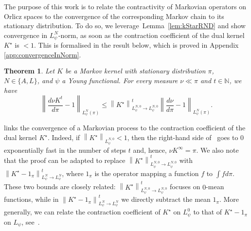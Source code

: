 \documentclass[11pt]{article}
\theoremstyle{plain}
\newtheorem{theorem}{Theorem}[section]
\theoremstyle{remark}
\begin{document}
    The purpose of this work is to relate the contractivity of Markovian operators %
    on Orlicz spaces to the convergence of the corresponding Markov chain to its stationary distribution. %
    To do so, we leverage~Lemma~\ref{lem:kStarRND} and show %
    convergence in $L_\psi^N$-norm, as soon as the contraction coefficient of the dual kernel ${K}^\star$ is $<1$. This is formalised in the result below, which is proved in Appendix \ref{app:convergenceInNorm}. %
    \begin{theorem}\label{thm:convergenceInNorm}
        Let $K$ be a Markov kernel with stationary distribution $\pi$, $N\in\{A,L\}$, and $\psi$ a Young functional. %
        For every measure $\nu\ll\pi$ and $t\in\mathbb{N}$, we have %
    \begin{equation}
            \left\lVert \frac{d\nu K^t}{d\pi} - 1 \right\rVert_{L^N_\psi(\pi)} \leq \left\lVert {K}^\star\right\rVert_{L_\psi^{N,0}\to L_\psi^{N,0} }^t\left\lVert \frac{d\nu}{d\pi}-1\right\rVert_{L_\psi^{N}(\pi)} .\label{eq:convergenceInNorm}
        \end{equation}
    \end{theorem}
    links the convergence of a Markovian process %
   to the contraction coefficient of the dual kernel $K^\star$. Indeed, if %
   $\left\lVert {K}^\star\right\rVert_{L_\psi^{N,0}}<1$, then %
   the right-hand side of~ goes to $0$ exponentially fast in the number of steps $t$ and, hence, %
   $\nu K^{\infty}=\pi$. %
   We also note that %
   the proof can be adapted to replace $\left\lVert {K}^\star\right\rVert_{L_\psi^{N,0}\to L_\psi^{N,0} }^t$ with $\left\lVert {K}^\star-1_\pi \right\rVert^t_{L_\psi^{N}\to L_\psi^{N}}$, where $1_\pi$ is the operator mapping a function $f$ to $\int f d\pi$. %
   These two bounds are closely related:
   $\left\lVert {K}^\star\right\rVert_{L_\psi^{N,0}\to L_\psi^{N,0} }^t$ focuses on $0$-mean functions, while in $\left\lVert {K}^\star-1_\pi \right\rVert^t_{L_\psi^{N}\to L_\psi^{N}}$ we directly subtract the mean $1_\pi$. 
 More generally, we can relate the contraction coefficient of $K^\star$ on $L_\psi^0$ to that of $K^\star-1_\pi$ on $L_\psi$, see~. %
\end{document}

